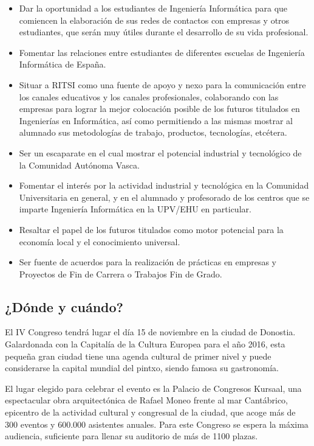 \documentclass[11pt]{ritsi/article}
\begin{document}
\begin{itemize}
    \item Dar la oportunidad a los estudiantes de Ingeniería Informática para que comiencen la elaboración de sus redes de contactos con empresas y otros estudiantes, que serán muy útiles durante el desarrollo de su vida profesional.
    \item Fomentar las relaciones entre estudiantes de diferentes escuelas de Ingeniería Informática de España.
    \item Situar a RITSI como una fuente de apoyo y nexo para la comunicación entre los canales educativos y los canales profesionales, colaborando con las empresas para lograr la mejor colocación posible de los futuros titulados en Ingenierías en Informática, así como permitiendo a las mismas mostrar al alumnado sus metodologías de trabajo, productos, tecnologías, etcétera.
    \item Ser un escaparate en el cual mostrar el potencial industrial y tecnológico de la Comunidad Autónoma Vasca.
    \item Fomentar el interés por la actividad industrial y tecnológica en la Comunidad Universitaria en general, y en el alumnado y profesorado de los centros que se imparte Ingeniería Informática en la UPV/EHU en particular.
    \item Resaltar el papel de los futuros titulados como motor potencial para la economía local y el conocimiento universal.
    \item Ser fuente de acuerdos para la realización de prácticas en empresas y Proyectos de Fin de Carrera o Trabajos Fin de Grado.
\end{itemize}

\subsection{¿Dónde y cuándo?}

El IV Congreso tendrá lugar el día 15 de noviembre en la ciudad de Donostia. Galardonada con la Capitalía de la Cultura Europea para el año 2016, esta pequeña gran ciudad tiene una agenda cultural de primer nivel y puede considerarse la capital mundial del pintxo, siendo famosa su gastronomía.

El lugar elegido para celebrar el evento es la Palacio de Congresos Kursaal, una espectacular obra arquitectónica de Rafael Moneo frente al mar Cantábrico, epicentro de la actividad cultural y congresual de la ciudad, que acoge más de 300 eventos y 600.000 asistentes anuales. Para este Congreso se espera la máxima audiencia, suficiente para llenar su auditorio de más de 1100 plazas.
\end{document}
